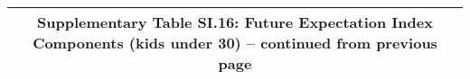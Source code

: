 \begin{longtable}{llcccccccccc}
\multicolumn{12}{c}{{\bfseries Supplementary Table SI.16: Future Expectation Index Components (kids under 30) -- continued from previous page}} \\ \hline                                                                                                                                                                                                                                                                                                                                                                                                                                                                                                                                                                                                                                                                                                                                 

\end{longtable}
